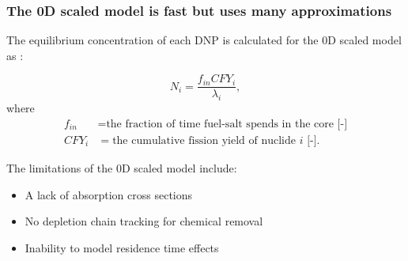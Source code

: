 \begin{frame}
  \frametitle{The 0D scaled model is fast but uses many approximations}
    The equilibrium concentration of each \gls{DNP} is calculated for the 0D scaled model as \cite{huynh2014calculation}:

    \begin{equation}
        N_i = \frac{f_{in} CFY_i}{\lambda_i},
        \label{eq:cfy-conc}
    \end{equation}
    where
    \begin{align}
        f_{in} &= \text{the fraction of time fuel-salt spends in the core [-]} \nonumber \\
        CFY_{i} &= \text{the cumulative fission yield of nuclide $i$ [-].} \nonumber
    \end{align}

    \begin{block}{The limitations of the 0D scaled model include:}
        \begin{itemize}
            \item A lack of absorption cross sections
            \item No depletion chain tracking for chemical removal
            \item Inability to model residence time effects
        \end{itemize}
    
    \end{block}

\end{frame}
